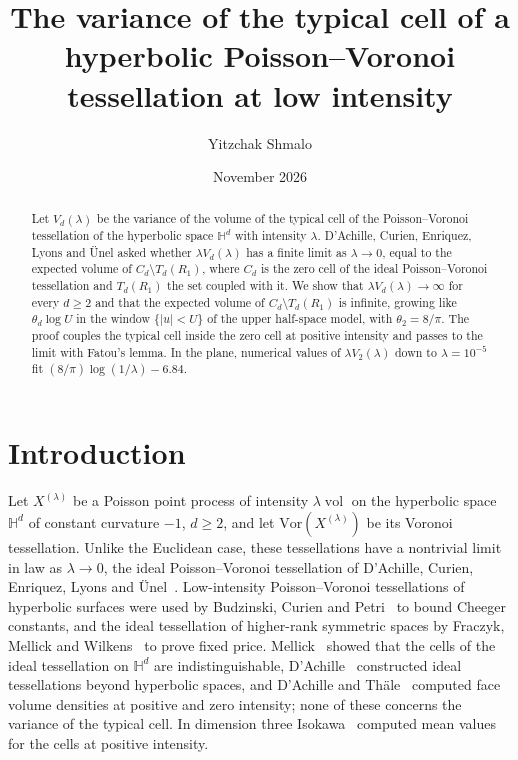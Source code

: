 \documentclass[11pt]{amsart}
\title[Variance of the typical hyperbolic Poisson--Voronoi cell]{The variance of the typical cell of a hyperbolic
Poisson--Voronoi tessellation at low intensity}
\author{Yitzchak Shmalo}
\date{November 2026}
\theoremstyle{remark}
\newcommand{\HH}{\mathbb{H}}
\newcommand{\vol}{\operatorname{vol}}
\begin{document}
\begin{abstract}
Let $V_d(\lambda)$ be the variance of the volume of the typical cell of the Poisson--Voronoi tessellation of the
hyperbolic space $\HH^d$ with intensity $\lambda$. D'Achille, Curien, Enriquez, Lyons and \"Unel asked whether
$\lambda V_d(\lambda)$ has a finite limit as $\lambda\to0$, equal to the expected volume of
$C_d\setminus T_d(R_1)$, where $C_d$ is the zero cell of the ideal Poisson--Voronoi tessellation and $T_d(R_1)$ the
set coupled with it. We show that $\lambda V_d(\lambda)\to\infty$ for every $d\ge2$ and that the expected volume of
$C_d\setminus T_d(R_1)$ is infinite, growing like $\theta_d\log U$ in the window $\{|u|<U\}$ of the upper half-space
model, with $\theta_2=8/\pi$. The proof couples the typical cell inside the zero cell at positive intensity and passes
to the limit with Fatou's lemma. In the plane, numerical values of $\lambda V_2(\lambda)$ down to $\lambda=10^{-5}$ fit
$(8/\pi)\log(1/\lambda)-6.84$.
\end{abstract}
\maketitle

\section{Introduction}\label{sec:intro}

Let $X^{(\lambda)}$ be a Poisson point process of intensity $\lambda\vol$ on the hyperbolic space $\HH^d$ of constant
curvature $-1$, $d\ge2$, and let $\mathrm{Vor}(X^{(\lambda)})$ be its Voronoi tessellation. Unlike the Euclidean case,
these tessellations have a nontrivial limit in law as $\lambda\to0$, the ideal Poisson--Voronoi tessellation of
D'Achille, Curien, Enriquez, Lyons and \"Unel~\cite{DCELU}. Low-intensity Poisson--Voronoi tessellations of hyperbolic
surfaces were used by Budzinski, Curien and Petri~\cite{BCP} to bound Cheeger constants, and the ideal tessellation of
higher-rank symmetric spaces by Fraczyk, Mellick and Wilkens~\cite{FMW} to prove fixed price. Mellick~\cite{Mellick}
showed that the cells of the ideal tessellation on $\HH^d$ are indistinguishable, D'Achille~\cite{DA} constructed ideal
tessellations beyond hyperbolic spaces, and D'Achille and Th\"ale~\cite{DT} computed face volume densities at positive
and zero intensity; none of these concerns the variance of the typical cell. In dimension three Isokawa~\cite{Isokawa}
computed mean values for the cells at positive intensity.
\end{document}
